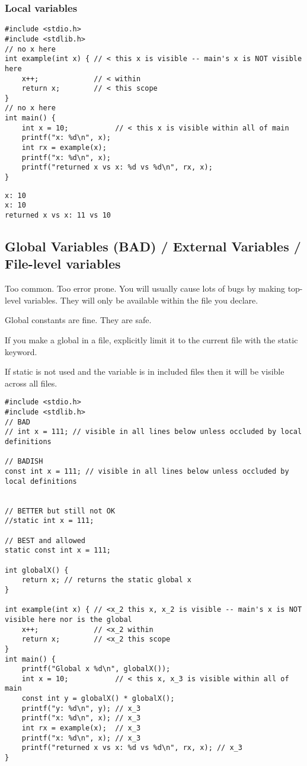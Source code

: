 \documentclass[11pt]{article}
\begin{document}
\subsubsection{Local variables}
\label{sec:org46022dd}


\begin{verbatim}
#include <stdio.h>
#include <stdlib.h>
// no x here
int example(int x) { // < this x is visible -- main's x is NOT visible here
    x++;             // < within
    return x;        // < this scope
}
// no x here
int main() {
    int x = 10;           // < this x is visible within all of main
    printf("x: %d\n", x);
    int rx = example(x);
    printf("x: %d\n", x);
    printf("returned x vs x: %d vs %d\n", rx, x);
}
\end{verbatim}

\begin{verbatim}
x: 10
x: 10
returned x vs x: 11 vs 10
\end{verbatim}

\subsection{Global Variables (BAD) / External Variables / File-level variables}
\label{sec:org11aa2aa}

Too common. Too error prone. You will usually cause lots of bugs by
making top-level variables. They will only be available within the
file you declare.

Global constants are fine. They are safe.

If you make a global in a file, explicitly limit it to the current
file with the static keyword.

If static is not used and the variable is in included files then it
will be visible across all files.

\begin{verbatim}
#include <stdio.h>
#include <stdlib.h>
// BAD
// int x = 111; // visible in all lines below unless occluded by local definitions

// BADISH
const int x = 111; // visible in all lines below unless occluded by local definitions


// BETTER but still not OK 
//static int x = 111;

// BEST and allowed
static const int x = 111;

int globalX() {
    return x; // returns the static global x
}

int example(int x) { // <x_2 this x, x_2 is visible -- main's x is NOT visible here nor is the global
    x++;             // <x_2 within
    return x;        // <x_2 this scope
}
int main() {
    printf("Global x %d\n", globalX());
    int x = 10;           // < this x, x_3 is visible within all of main
    const int y = globalX() * globalX();
    printf("y: %d\n", y); // x_3    
    printf("x: %d\n", x); // x_3
    int rx = example(x);  // x_3
    printf("x: %d\n", x); // x_3
    printf("returned x vs x: %d vs %d\n", rx, x); // x_3
}
\end{verbatim}
\end{document}
